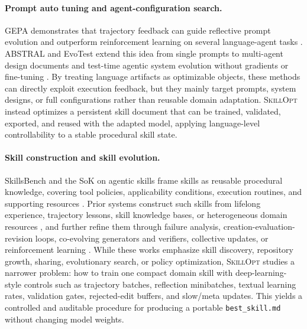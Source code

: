 \documentclass{llmxive}
\providecommand{\ourmethod}{\textsc{SkillOpt}\xspace}
\begin{document}
\paragraph{Prompt auto tuning and agent-configuration search.}
GEPA demonstrates that trajectory feedback can guide reflective prompt evolution and outperform reinforcement learning on several language-agent tasks \citep{agrawal2025gepa}. ABSTRAL and EvoTest extend this idea from single prompts to multi-agent design documents and test-time agentic system evolution without gradients or fine-tuning \citep{song2026abstral,he2025evotest}. By treating language artifacts as optimizable objects, these methods can directly exploit execution feedback, but they mainly target prompts, system designs, or full configurations rather than reusable domain adaptation. \ourmethod{} instead optimizes a persistent skill document that can be trained, validated, exported, and reused with the adapted model, applying language-level controllability to a stable procedural skill state.

\paragraph{Skill construction and skill evolution.}
SkillsBench and the SoK on agentic skills frame skills as reusable procedural knowledge, covering tool policies, applicability conditions, execution routines, and supporting resources \citep{li2026skillsbench,jiang2026sok}. Prior systems construct such skills from lifelong experience, trajectory lessons, skill knowledge bases, or heterogeneous domain resources \citep{yang2026autoskill,ni2026trace2skill,wang2026skillx,shen2026skillfoundry,memp}, and further refine them through failure analysis, creation-evaluation-revision loops, co-evolving generators and verifiers, collective updates, or reinforcement learning \citep{alzubi2026evoskill,luo2026skillforge,zhang2026coevoskills,ma2026skillclaw,xia2026skillrl,wang2025reinforcement,autorefine,procmem,evolver}. While these works emphasize skill discovery, repository growth, sharing, evolutionary search, or policy optimization, \ourmethod{} studies a narrower problem: how to train one compact domain skill with deep-learning-style controls such as trajectory batches, reflection minibatches, textual learning rates, validation gates, rejected-edit buffers, and slow/meta updates. This yields a controlled and auditable procedure for producing a portable \texttt{best\_skill.md} without changing model weights.
\end{document}
